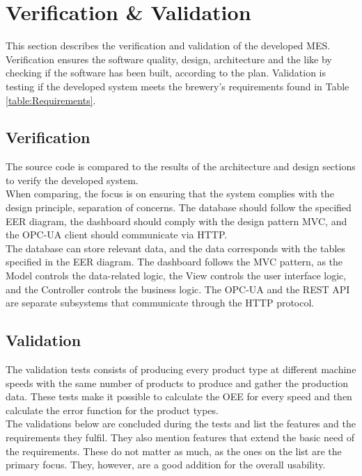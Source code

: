 \section{Verification \& Validation}
This section describes the verification and validation of the developed MES.\\

Verification ensures the software quality, design, architecture and the like by
checking if the software has been built, according to the plan. Validation is
testing if the developed system meets the brewery's requirements found in Table
\ref{table:Requirements}.

\subsection{Verification}
The source code is compared to the results of the architecture and design
sections to verify the developed system. \\

When comparing, the focus is on ensuring that the system complies with the
design principle, separation of concerns. The database should follow the
specified EER diagram, the dashboard should comply with the design pattern MVC,
and the OPC-UA client should communicate via HTTP. \\

The database can store relevant data, and the data corresponds with the tables
specified in the EER diagram. The dashboard follows the MVC pattern, as the
Model controls the data-related logic, the View controls the user interface
logic, and the Controller controls the business logic. The OPC-UA and the REST
API are separate subsystems that communicate through the HTTP protocol. 


\subsection{Validation}
The validation tests consists of producing every product type at different
machine speeds with the same number of products to produce and gather the
production data. These tests make it possible to calculate the OEE for every
speed and then calculate the error function for the product types.\\

The validations below are concluded during the tests and list the features and
the requirements they fulfil. They also mention features that extend the basic
need of the requirements. These do not matter as much, as the ones on the list
are the primary focus. They, however, are a good addition for the overall
usability.

